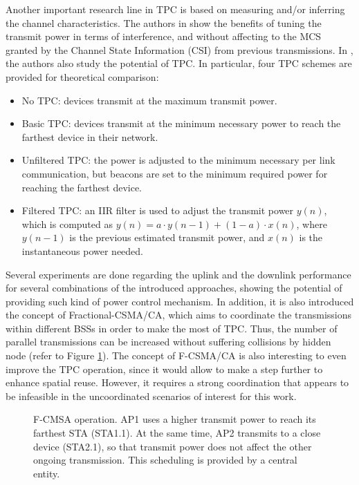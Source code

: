 \documentclass[12pt, a4paper,twoside]{tesi_upf}
\begin{document}
				Another important research line in TPC is based on measuring and/or inferring the channel characteristics. The authors in \cite{chaves2014adaptive} show the benefits of tuning the transmit power in terms of interference, and without affecting to the MCS granted by the Channel State Information (CSI) from previous transmissions. In \cite{oteri2013advanced}, the authors also study the potential of TPC. In particular, four TPC schemes are provided for theoretical comparison:
				\begin{itemize}
					\item No TPC: devices transmit at the maximum transmit power.
					\item Basic TPC: devices transmit at the minimum necessary power to reach the farthest device in their network.
					\item Unfiltered TPC: the power is adjusted to the minimum necessary per link communication, but beacons are set to the minimum required power for reaching the farthest device.
					\item Filtered TPC: an IIR filter is used to adjust the transmit power $y(n)$, which is computed as $y(n) = a \cdot y(n-1) + (1-a) \cdot x(n)$, where  $y(n-1)$ is the previous estimated transmit power, and $x(n)$ is the instantaneous power needed.
				\end{itemize}  
			
				Several experiments are done regarding the uplink and the downlink performance for several combinations of the introduced approaches, showing the potential of providing such kind of power control mechanism. In addition, it is also introduced the concept of Fractional-CSMA/CA, which aims to coordinate the transmissions within different BSSs in order to make the most of TPC. Thus, the number of parallel transmissions can be increased without suffering collisions by hidden node (refer to Figure \ref{fig:fcsma}). The concept of F-CSMA/CA is also interesting to even improve the TPC operation, since it would allow to make a step further to enhance spatial reuse. However, it requires a strong coordination that appears to be infeasible in the uncoordinated scenarios of interest for this work.
				\begin{figure}[t!]
					\centering
					\caption{F-CMSA operation. AP1 uses a higher transmit power to reach its farthest STA (STA1.1). At the same time, AP2 transmits to a close device (STA2.1), so that transmit power does not affect the other ongoing transmission. This scheduling is provided by a central entity.}
					\label{fig:fcsma}
				\end{figure}	
			
\end{document}
